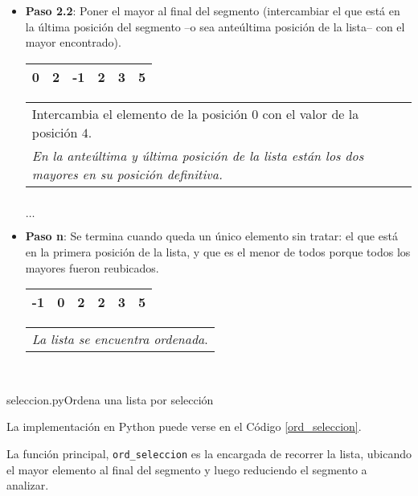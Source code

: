\begin{itemize}
\item {\bf Paso 2.2}: Poner el mayor al final del segmento (intercambiar el que está en la última
posición del segmento --o sea anteúltima posición de la lista-- con el mayor encontrado). \\

\hspace{0.75cm}
\begin{tabular}[c]{|c|c|c|c|c|c|}
\hline
0& 2&-1&2&3&5\\
\hline
\end{tabular}
\hspace{0.75cm}
\begin{tabular}{p{9cm}}
Intercambia el elemento de la posición $0$ con el valor de la posición $4$. \\
{\it En la anteúltima y última posición de la lista están los dos mayores en su posición definitiva.}
\end{tabular} \\

$\dots$\\

\item {\bf Paso n}: Se termina cuando queda un único elemento sin tratar: el que está
en la primera posición de la lista, y que es el menor de todos porque todos los
mayores fueron reubicados. \\

\hspace{0.75cm}
\begin{tabular}[c]{|c|c|c|c|c|c|}
\hline
-1& 0&2&2&3&5\\
\hline
\end{tabular}
\hspace{0.75cm}
\begin{tabular}{p{9cm}}
{\it La lista se encuentra ordenada}.
\end{tabular}\\
\end{itemize}

\begin{codigo}{seleccion.py}{Ordena una lista por selección}
\label{ord_seleccion}

\end{codigo}

La implementación en Python puede verse en el Código \ref{ord_seleccion}.


La función principal, \lstinline!ord_seleccion! es la encargada de recorrer
la lista, ubicando el mayor elemento al final del segmento y luego
reduciendo el segmento a analizar.

